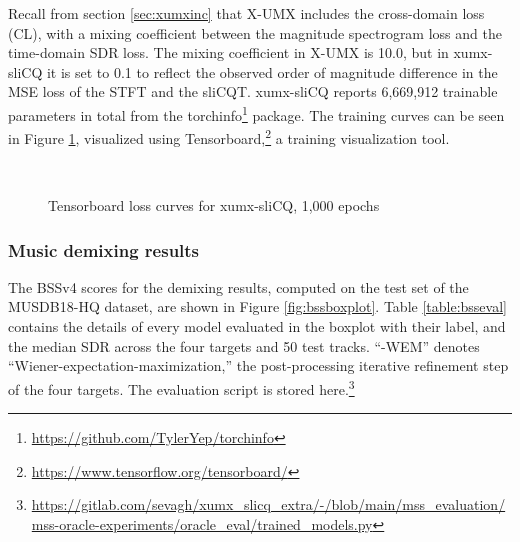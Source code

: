 \documentclass[report.tex]{subfiles}
\begin{document}
Recall from section \ref{sec:xumxinc} that X-UMX includes the cross-domain loss (CL), with a mixing coefficient between the magnitude spectrogram loss and the time-domain SDR loss. The mixing coefficient in X-UMX is 10.0, but in xumx-sliCQ it is set to 0.1 to reflect the observed order of magnitude difference in the MSE loss of the STFT and the sliCQT. xumx-sliCQ reports 6,669,912 trainable parameters in total from the torchinfo\footnote{\url{https://github.com/TylerYep/torchinfo}} package. The training curves can be seen in Figure \ref{fig:networkloss}, visualized using Tensorboard,\footnote{\url{https://www.tensorflow.org/tensorboard/}} a training visualization tool.

\begin{figure}[ht]
	\centering
	\\
	\caption{Tensorboard loss curves for xumx-sliCQ, 1,000 epochs}
	\label{fig:networkloss}
\end{figure}

\newpagefill

\subsubsection{Music demixing results}
\label{sec:demixresults}

The BSSv4 scores for the demixing results, computed on the test set of the MUSDB18-HQ \parencite{musdb18hq} dataset, are shown in Figure \ref{fig:bssboxplot}. Table \ref{table:bsseval} contains the details of every model evaluated in the boxplot with their label, and the median SDR across the four targets and 50 test tracks. ``-WEM'' denotes ``Wiener-expectation-maximization,'' the post-processing iterative refinement step of the four targets. The evaluation script is stored here.\footnote{\url{https://gitlab.com/sevagh/xumx_slicq_extra/-/blob/main/mss_evaluation/mss-oracle-experiments/oracle_eval/trained_models.py}}
\end{document}
